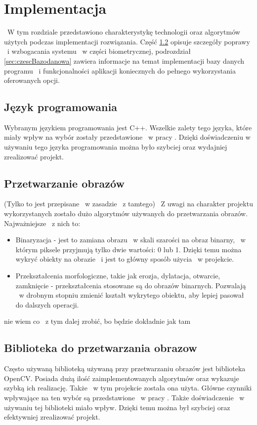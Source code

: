\chapter{Implementacja}
\label{cha:projekt}
~W tym rozdziale przedstawiono charakterystykę technologii oraz algorytmów użytych podczas implementacji rozwiązania. Część \ref{sec:przetwarzanieObrazow} opisuje szczegóły poprawy ~i wzbogacania systemu ~w części biometrycznej, podrozdział \ref{sec:czescBazodanowa} zawiera informacje na temat implementacji bazy danych programu ~i funkcjonalności aplikacji koniecznych do pełnego wykorzystania oferowanych opcji.

\section{Język programowania}
\label{sec:jezykProgramowania}
Wybranym językiem programowania jest C++. Wszelkie zalety tego języka, które miały wpływ na wybór zostały przedstawione ~w pracy \cite{Gl11}. Dzięki doświadczeniu w używaniu tego języka programowania można było szybciej oraz wydajniej zrealizować projekt.

\section{Przetwarzanie obrazów}
\label{sec:przetwarzanieObrazow}
(Tylko to jest przepisane ~w zasadzie ~z tamtego)
~Z uwagi na charakter projektu wykorzystanych zostało dużo algorytmów używanych do przetwarzania obrazów. Najważniejsze ~z nich to:
\begin{itemize}
\item Binaryzacja - jest to zamiana obrazu ~w skali szarości na obraz binarny, ~w którym piksele przyjmują tylko dwie wartości: 0 lub 1. Dzięki temu można wykryć obiekty na obrazie ~i jest to główny sposób użycia ~w projekcie.
\item Przekształcenia morfologiczne, takie jak erozja, dylatacja, otwarcie, zamknięcie - przekształcenia stosowane są do obrazów binarnych. Pozwalają ~w drobnym stopniu zmienić kształt wykrytego obiektu, aby lepiej pasował do dalszych operacji. 
\end{itemize}

nie wiem co ~z tym dalej zrobić, bo będzie dokładnie jak tam

\section{Biblioteka do przetwarzania obrazow}
\label{sec:bibliotekaObrazow}
Często używaną biblioteką używaną przy przetwarzaniu obrazów jest biblioteka OpenCV. Posiada dużą ilość zaimplementowanych algorytmów oraz wykazuje szybką ich realizację. Także ~w tym projekcie została ona użyta. Główne czynniki wpływające na ten wybór są przedstawione ~w pracy \cite{Gl11}. Także doświadczenie ~w używaniu tej biblioteki miało wpływ. Dzięki temu można był szybciej oraz efektywniej zrealizować projekt.

